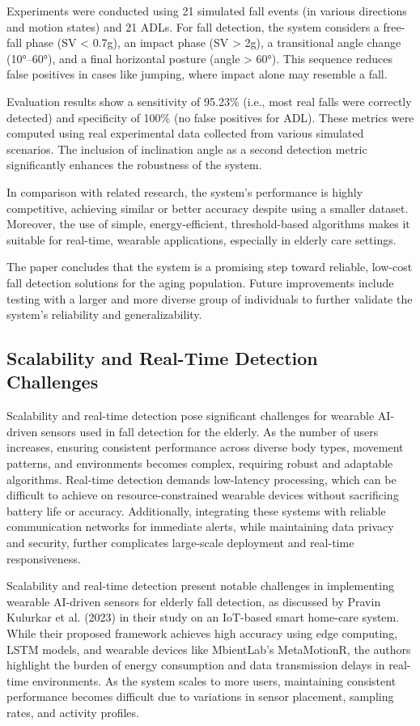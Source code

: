 \documentclass[a4paper, 12pt]{report}
\begin{document}
Experiments were conducted using 21 simulated fall events (in various directions and motion states) and 21 ADLs. For fall detection, the system considers a free-fall phase (SV < 0.7g), an impact phase (SV > 2g), a transitional angle change (10°–60°), and a final horizontal posture (angle > 60°). This sequence reduces false positives in cases like jumping, where impact alone may resemble a fall.

Evaluation results show a sensitivity of 95.23\% (i.e., most real falls were correctly detected) and specificity of 100\% (no false positives for ADL). These metrics were computed using real experimental data collected from various simulated scenarios. The inclusion of inclination angle as a second detection metric significantly enhances the robustness of the system.

In comparison with related research, the system's performance is highly competitive, achieving similar or better accuracy despite using a smaller dataset. Moreover, the use of simple, energy-efficient, threshold-based algorithms makes it suitable for real-time, wearable applications, especially in elderly care settings.

The paper concludes that the system is a promising step toward reliable, low-cost fall detection solutions for the aging population. Future improvements include testing with a larger and more diverse group of individuals to further validate the system's reliability and generalizability.

\subsection{Scalability and Real-Time Detection Challenges}
Scalability and real-time detection pose significant challenges for wearable AI-driven sensors used in fall detection for the elderly. As the number of users increases, ensuring consistent performance across diverse body types, movement patterns, and environments becomes complex, requiring robust and adaptable algorithms. Real-time detection demands low-latency processing, which can be difficult to achieve on resource-constrained wearable devices without sacrificing battery life or accuracy. Additionally, integrating these systems with reliable communication networks for immediate alerts, while maintaining data privacy and security, further complicates large-scale deployment and real-time responsiveness.

Scalability and real-time detection present notable challenges in implementing wearable AI-driven sensors for elderly fall detection, as discussed by Pravin Kulurkar et al. (2023) in their study on an IoT-based smart home-care system. While their proposed framework achieves high accuracy using edge computing, LSTM models, and wearable devices like MbientLab's MetaMotionR, the authors highlight the burden of energy consumption and data transmission delays in real-time environments. As the system scales to more users, maintaining consistent performance becomes difficult due to variations in sensor placement, sampling rates, and activity profiles.
\end{document}
